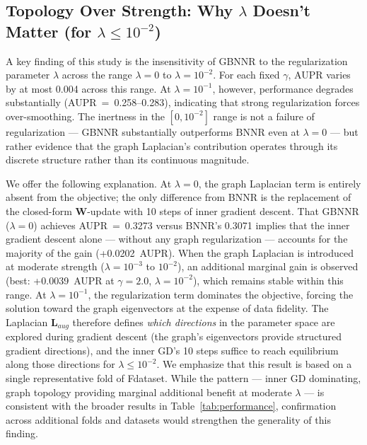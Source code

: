 \documentclass[unnumsec,webpdf,contemporary,large]{oup-authoring-template}
\begin{document}
\subsection{Topology Over Strength: Why $\lambda$ Doesn't Matter (for $\lambda \leq 10^{-2}$)}
\label{sec:topology_over_strength}

A key finding of this study is the insensitivity of GBNNR to the regularization parameter $\lambda$ across the range $\lambda = 0$ to $\lambda = 10^{-2}$. For each fixed $\gamma$, AUPR varies by at most 0.004 across this range. At $\lambda = 10^{-1}$, however, performance degrades substantially (AUPR~=~0.258--0.283), indicating that strong regularization forces over-smoothing. The inertness in the $[0, 10^{-2}]$ range is not a failure of regularization --- GBNNR substantially outperforms BNNR even at $\lambda = 0$ --- but rather evidence that the graph Laplacian's contribution operates through its discrete structure rather than its continuous magnitude.

We offer the following explanation. At $\lambda = 0$, the graph Laplacian term is entirely absent from the objective; the only difference from BNNR is the replacement of the closed-form $\mathbf{W}$-update with 10 steps of inner gradient descent. That GBNNR ($\lambda = 0$) achieves AUPR~=~0.3273 versus BNNR's 0.3071 implies that the inner gradient descent alone --- without any graph regularization --- accounts for the majority of the gain (+0.0202~AUPR). When the graph Laplacian is introduced at moderate strength ($\lambda = 10^{-3}$ to $10^{-2}$), an additional marginal gain is observed (best: +0.0039~AUPR at $\gamma=2.0$, $\lambda=10^{-2}$), which remains stable within this range. At $\lambda = 10^{-1}$, the regularization term dominates the objective, forcing the solution toward the graph eigenvectors at the expense of data fidelity. The Laplacian $\mathbf{L}_{aug}$ therefore defines \textit{which directions} in the parameter space are explored during gradient descent (the graph's eigenvectors provide structured gradient directions), and the inner GD's 10 steps suffice to reach equilibrium along those directions for $\lambda \leq 10^{-2}$. We emphasize that this result is based on a single representative fold of Fdataset. While the pattern --- inner GD dominating, graph topology providing marginal additional benefit at moderate $\lambda$ --- is consistent with the broader results in Table~\ref{tab:performance}, confirmation across additional folds and datasets would strengthen the generality of this finding.
\end{document}
